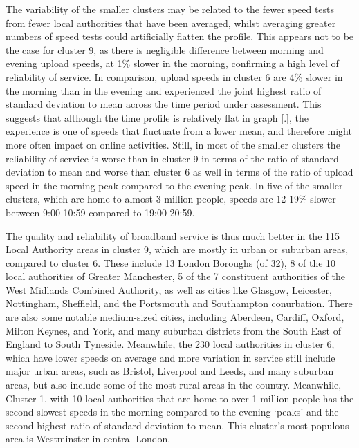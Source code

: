 \documentclass[]{interact}
\theoremstyle{plain}%
\theoremstyle{definition}
\theoremstyle{remark}
\begin{document}
The variability of the smaller clusters may be related to the fewer
speed tests from fewer local authorities that have been averaged, whilst
averaging greater numbers of speed tests could artificially flatten the
profile. This appears not to be the case for cluster 9, as there is
negligible difference between morning and evening upload speeds, at 1\%
slower in the morning, confirming a high level of reliability of
service. In comparison, upload speeds in cluster 6 are 4\% slower in the
morning than in the evening and experienced the joint highest ratio of
standard deviation to mean across the time period under assessment. This
suggests that although the time profile is relatively flat in graph
{[}.{]}, the experience is one of speeds that fluctuate from a lower
mean, and therefore might more often impact on online activities. Still,
in most of the smaller clusters the reliability of service is worse than
in cluster 9 in terms of the ratio of standard deviation to mean and
worse than cluster 6 as well in terms of the ratio of upload speed in
the morning peak compared to the evening peak. In five of the smaller
clusters, which are home to almost 3 million people, speeds are 12-19\%
slower between 9:00-10:59 compared to 19:00-20:59.

The quality and reliability of broadband service is thus much better in
the 115 Local Authority areas in cluster 9, which are mostly in urban or
suburban areas, compared to cluster 6. These include 13 London Boroughs
(of 32), 8 of the 10 local authorities of Greater Manchester, 5 of the 7
constituent authorities of the West Midlands Combined Authority, as well
as cities like Glasgow, Leicester, Nottingham, Sheffield, and the
Portsmouth and Southampton conurbation. There are also some notable
medium-sized cities, including Aberdeen, Cardiff, Oxford, Milton Keynes,
and York, and many suburban districts from the South East of England to
South Tyneside. Meanwhile, the 230 local authorities in cluster 6, which
have lower speeds on average and more variation in service still include
major urban areas, such as Bristol, Liverpool and Leeds, and many
suburban areas, but also include some of the most rural areas in the
country. Meanwhile, Cluster 1, with 10 local authorities that are home
to over 1 million people has the second slowest speeds in the morning
compared to the evening `peaks' and the second highest ratio of standard
deviation to mean. This cluster's most populous area is Westminster in
central London.
\end{document}
